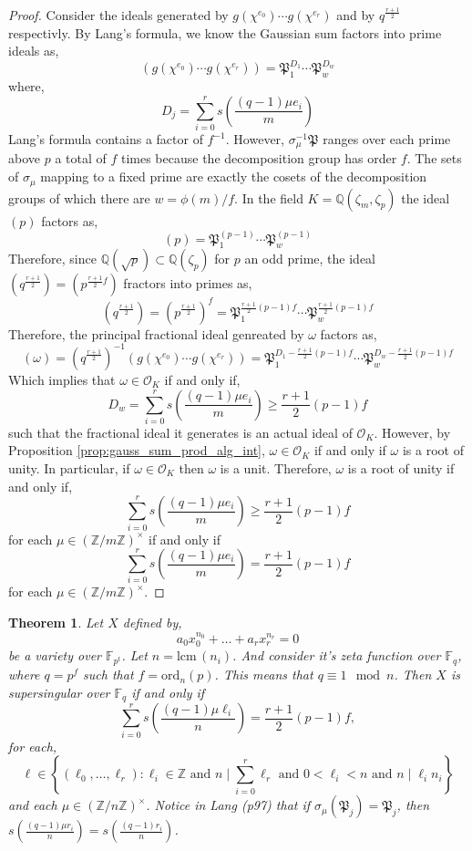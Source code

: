 \documentclass{article}
\newcommand{\Z}{\mathbb{Z}}
\newcommand{\Q}{\mathbb{Q}}
\newcommand{\F}{\mathbb{F}}
\newcommand{\Pf}{\mathfrak{P}}
\newcommand{\iO}{\mathcal{O}}
\newcommand{\divides}{\mid}
\newcommand{\s}[1]{s\left( #1 \right)}
\newcommand{\lcm}[0]{\mathrm{lcm} \,}
\newtheorem{theorem}{Theorem}[section]
\theoremstyle{definition}
\theoremstyle{definition}
\theoremstyle{remark}
\begin{document}
\begin{proof}
Consider the ideals generated by $g(\chi^{e_0}) \cdots g(\chi^{e_r})$ and by $q^{\frac{r+1}{2}}$ respectivly. By Lang's formula, we know the Gaussian sum factors into prime ideals as,
\[ (g(\chi^{e_0}) \cdots g(\chi^{e_r})) = \mathfrak{P}_1^{D_1} \cdots \mathfrak{P}_{w}^{D_{w}} \]
where,
\[ D_j = \sum_{i = 0}^r s\left(\frac{(q-1) \mu e_i}{m}\right) \]
Lang's formula contains a factor of $f^{-1}$. However, $\sigma_\mu^{-1} \mathfrak{P}$ ranges over each prime above $p$ a total of $f$ times because the decomposition group has order $f$. The sets of $\sigma_\mu$ mapping to a fixed prime are exactly the cosets of the decomposition groups of which there are $w = \phi(m)/f$. In the field $K = \Q(\zeta_m, \zeta_p)$ the ideal $(p)$ factors as,
\[ (p) = \mathfrak{P}_1^{(p-1)} \cdots \mathfrak{P}_w^{(p-1)} \] Therefore, since $\Q(\sqrt{p}) \subset \Q(\zeta_p)$ for $p$ an odd prime, the ideal $(q^{\frac{r+1}{2}}) = (p^{\frac{r+1}{2} f})$ fractors into primes as,
\[ (q^\frac{r+1}{2}) = (p^\frac{r+1}{2})^f = \mathfrak{P}_1^{\frac{r+1}{2} (p-1) f} \cdots \mathfrak{P}_w^{\frac{r+1}{2} (p-1) f} \]
Therefore, the principal fractional ideal genreated by $\omega$ factors as,
\[ (\omega) = (q^{\frac{r+1}{2}})^{-1} (g(\chi^{e_0}) \cdots g(\chi^{e_r})) = \mathfrak{P}_1^{D_1 - \frac{r+1}{2} (p-1) f} \cdots \mathfrak{P}_{w}^{D_{w} - \frac{r+1}{2} (p-1) f } \] 
Which implies that $\omega \in \iO_K$ if and only if,
\[ D_w =\sum_{i = 0}^r s\left(\frac{(q-1) \mu e_i}{m}\right) \ge \frac{r+1}{2} (p - 1) f \]
such that the fractional ideal it generates is an actual ideal of $\iO_{K}$. However, by Proposition \ref{prop:gauss_sum_prod_alg_int}, $\omega \in \iO_K$ if and only if $\omega$ is a root of unity. In particular, if $\omega \in \iO_K$ then $\omega$ is a unit. Therefore, $\omega$ is a root of unity if and only if,
\[ \sum_{i = 0}^r s\left(\frac{(q-1) \mu e_i}{m}\right) \ge \frac{r+1}{2} (p - 1) f \]
for each $\mu \in (\Z / m \Z)^\times$
if and only if
\[ \sum_{i = 0}^r s\left(\frac{(q-1) \mu e_i}{m}\right) = \frac{r+1}{2} (p - 1) f \]
for each $\mu \in (\Z / m \Z)^\times$. 
\end{proof}


\begin{theorem}\label{thm:gauss_factor_SS}
Let $X$ defined by,
\[ a_0 x_0^{n_0} + \dots + a_r x_r^{n_r} = 0 \]
be a variety over $\F_{p^t}$. Let $n = \lcm(n_i)$. And consider it's zeta function over $\F_q$, where $q = p^f$ such that $f = \text{ord}_n(p)$. This means that $q \equiv 1 \mod n$. Then $X$ is supersingular over $\F_q$ if and only if 
\[ \sum_{i = 0}^{r} \s{ \frac{(q-1)\mu \ell_i}{n} } = \frac{r+1}{2}(p - 1)f,\]
for each,
\[ \ell \in \left\{(\ell_0, \dots, \ell_r) : \ell_i \in \Z \text{ and } n \divides \sum_{i = 0}^{r} \ell_r \text{ and } 0 < \ell_i < n \text{ and } n \divides \ell_i n_i \right\} \]
and each $\mu \in (\Z/n\Z)^\times$. Notice in Lang (p97) that if $\sigma_\mu(\Pf_j) = \Pf_j$, then $s\left(\frac{(q-1)\mu r_i}{n}\right) = s\left(\frac{(q-1) r_i}{n}\right)$.
\end{theorem}
\end{document}
